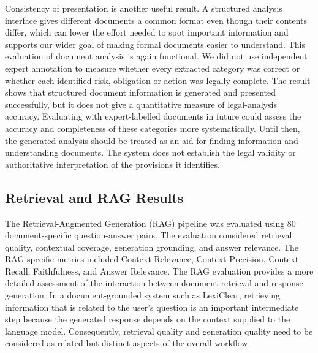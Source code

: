 \documentclass[12pt,a4paper,oneside]{report}
\begin{document}
Consistency of presentation is another useful result. A structured analysis interface gives different documents a common format even though their contents differ, which can lower the effort needed to spot important information and supports our wider goal of making formal documents easier to understand. This evaluation of document analysis is again functional. We did not use independent expert annotation to measure whether every extracted category was correct or whether each identified risk, obligation or action was legally complete. The result shows that structured document information is generated and presented successfully, but it does not give a quantitative measure of legal-analysis accuracy. Evaluating with expert-labelled documents in future could assess the accuracy and completeness of these categories more systematically. Until then, the generated analysis should be treated as an aid for finding information and understanding documents. The system does not establish the legal validity or authoritative interpretation of the provisions it identifies.

\subsection{Retrieval and RAG Results}

The Retrieval-Augmented Generation (RAG) pipeline was evaluated using 80 document-specific question-answer pairs. The evaluation considered retrieval quality, contextual coverage, generation grounding, and answer relevance. The RAG-specific metrics included Context Relevance, Context Precision, Context Recall, Faithfulness, and Answer Relevance. The RAG evaluation provides a more detailed assessment of the interaction between document retrieval and response generation. In a document-grounded system such as LexiClear, retrieving information that is related to the user's question is an important intermediate step because the generated response depends on the context supplied to the language model. Consequently, retrieval quality and generation quality need to be considered as related but distinct aspects of the overall workflow.
\end{document}
